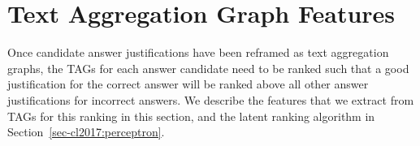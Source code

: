 


\section{Text Aggregation Graph Features}
\label{sec-cl2017:scoring}

Once candidate answer justifications have been reframed as text aggregation graphs, the TAGs for each answer candidate need to be ranked such that a good justification for the correct answer will be ranked above all other answer justifications for incorrect answers. We describe the features that we extract from TAGs for this ranking in this section, and the latent ranking algorithm in Section~\ref{sec-cl2017:perceptron}.




